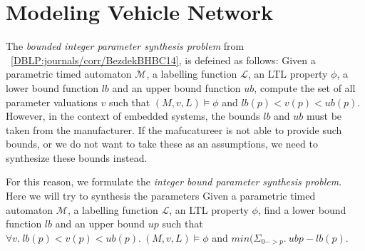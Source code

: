  \section{Modeling Vehicle Network}
 
 The \textit{bounded integer parameter synthesis problem} from ~\ref{DBLP:journals/corr/BezdekBHBC14}, is defeined as follows:
Given a parametric timed automaton $\mathcal{M}$, a labelling
function $\mathcal{L}$, an LTL property $\phi$, a lower bound function $lb$ and an upper bound
function $ub$, compute the set of all parameter valuations $v$ such that $(M, v,L) \models \phi$ and $lb(p) < v(p) < ub(p)$.
However, in the context of embedded systems, the bounds $lb$ and $ub$ must be taken from the manufacturer.
If the mafucatureer is not able to provide such bounds, or we do not want to take these as an assumptions, we need to synthesize these bounds instead.

For this reason, we formulate the \textit{integer bound parameter synthesis problem}.
Here we will try to synthesis the parameters
Given a parametric timed automaton $\mathcal{M}$, a labelling function $\mathcal{L}$, an LTL property $\phi$, 
find a lower bound function $lb$ and an upper bound $up$ such that $\forall v.\ lb(p) < v(p) < ub(p).\ (M, v,L) \models \phi$ and $min(\Sigma_{0->p}.\ ub{p}-lb(p)$.






